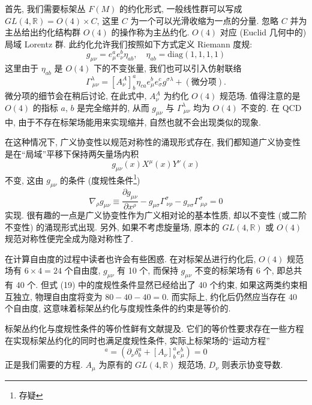 \documentclass{article}
\begin{document}
首先, 我们需要标架丛 $F(M)$ 的约化形式, 一般线性群可以写成  $GL(4,\mathbb{R})=O(4)\times C$, 这里 $C$ 为一个可以光滑收缩为一点的分量. 忽略 $C$ 并为主丛给出约化结构群 $O(4)$ 的操作称为主丛约化. $O(4)$ 对应 (Euclid 几何中的) 局域 Lorentz 群. 此约化允许我们按照如下方式定义 Riemann 度规:
\begin{equation}
g_{\mu\nu}=e_{\mu}^{a}e^{b}_{\nu}\eta_{ab}, \quad\eta_{ab}=\textrm{diag}(1,1,1,1)
\end{equation}
这里由于 $\eta_{ab}$ 是 $O(4)$ 下的不变张量, 我们也可以引入仿射联络
\begin{equation}
\Gamma_{\ \mu\nu}^{\lambda}=[A_{\nu}^{A}]_{b}^{a}\eta_{ca}e_{\mu}^{b}e_{\sigma}^{c}g^{\sigma\lambda}+(\textrm{微分项}).
\end{equation}
微分项的细节会在稍后讨论, 在此式中, $A_{\nu}^{A}$ 为约化 $O(4)$ 规范场. 值得注意的是 $O(4)$ 的指标 $a$, $b$ 是完全缩并的, 从而 $g_{\mu\nu}$ 与 $\Gamma_{\ \mu\nu}^{\lambda}$ 均为 $O(4)$ 不变的. 在 QCD 中, 由于不存在标架场能用来实现缩并, 自然也就不会出现类似的现象.

 在这种情况下, 广义协变性以规范对称性的涌现形式存在, 我们都知道广义协变性是在``局域''平移下保持两矢量场内积
 \begin{equation}
 g_{\mu\nu}(x)X^{\mu}(x)Y^{\nu}(x)
 \end{equation}不变, 这由 $g_{\mu\nu}$ 的条件 (度规性条件\footnote{存疑})
\begin{equation}
\nabla_{\rho}g_{\mu\nu}\equiv \frac{\partial g_{\mu\nu}}{\partial x^{\rho}}-g_{\mu\sigma}\Gamma_{\ \nu\rho}^{\sigma}-g_{\nu\sigma}\Gamma_{\ \mu\rho}^{\sigma}=0
\end{equation}
实现. 很有趣的一点是广义协变性作为广义相对论的基本性质, 却以不变性 (或二阶不变性) 的涌现形式出现. 另外, 如果不考虑旋量场, 原本的 $GL(4,\mathbb{R})$ 或 $O(4)$ 规范对称性便完全成为隐对称性了.

在计算自由度的过程中读者也许会有些困惑. 在对标架丛进行约化后, $O(4)$ 规范场有 $6\times4=24$ 个自由度, $g_{\mu\nu}$ 有 10 个, 而保持 $g_{\mu\nu}$ 不变的标架场有 6 个, 即总共有 40 个. 但式 (19) 中的度规性条件显然已经给出了 40 个约束, 如果这两类约束相互独立, 物理自由度将变为 $80-40-40=0$. 而实际上, 约化后仍然应当存在 40 个自由度, 这意味着标架丛约化与度规性条件的约束是等价的.

标架丛约化与度规性条件的等价性鲜有文献提及. 它们的等价性要求存在一些方程在实现标架丛约化的同时也满足度规性条件, 实际上标架场的``运动方程''
\begin{equation}
[D_{\nu}e_{\mu}]^{a}=(\partial_{\nu}\delta_{b}^{a}+[A_{\nu}]^{a}_{b}e_{\mu}^{b})=0
\end{equation}
正是我们需要的方程. $A_{\mu}$ 为原有的 $GL(4,\mathbb{R})$ 规范场, $D_{\nu}$ 则表示协变导数.
\end{document}
